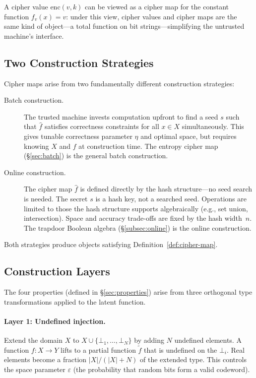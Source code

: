 \documentclass[11pt]{article}
\theoremstyle{definition}
\theoremstyle{plain}
\theoremstyle{remark}
\newcommand{\fhat}{\hat{f}}
\newcommand{\enc}{\mathrm{enc}}
\begin{document}
A cipher value $\enc(v, k)$ can be viewed as a cipher map for the constant
function $f_v(x) = v$: under this view, cipher values and cipher maps are
the same kind of object---a total function on bit strings---simplifying the
untrusted machine's interface.

\subsection{Two Construction Strategies}

Cipher maps arise from two fundamentally different construction strategies:

\begin{description}
\item[Batch construction.]  The trusted machine invests computation upfront
    to find a seed $s$ such that $\fhat$ satisfies correctness constraints
    for all $x \in X$ simultaneously.  This gives tunable correctness
    parameter $\eta$ and optimal space, but requires knowing $X$ and $f$ at
    construction time.  The entropy cipher map (\S\ref{sec:batch}) is the
    general batch construction.

\item[Online construction.]  The cipher map $\fhat$ is defined directly by
    the hash structure---no seed search is needed.  The secret $s$ is a hash
    key, not a searched seed.  Operations are limited to those the hash
    structure supports algebraically (e.g., set union, intersection).  Space
    and accuracy trade-offs are fixed by the hash width~$n$.  The trapdoor
    Boolean algebra (\S\ref{subsec:online}) is the online construction.
\end{description}

Both strategies produce objects satisfying Definition~\ref{def:cipher-map}.

\subsection{Construction Layers}
\label{subsec:layers}

The four properties (defined in \S\ref{sec:properties}) arise from three
orthogonal type transformations applied to the latent function.

\paragraph{Layer 1: Undefined injection.}
Extend the domain $X$ to $X \cup \{\bot_1, \ldots, \bot_N\}$ by adding $N$
undefined elements.  A function $f : X \to Y$ lifts to a partial function
$\tilde{f}$ that is undefined on the $\bot_i$.  Real elements become a
fraction $|X| / (|X| + N)$ of the extended type.  This controls the space
parameter $\varepsilon$ (the probability that random bits form a valid
codeword).
\end{document}
